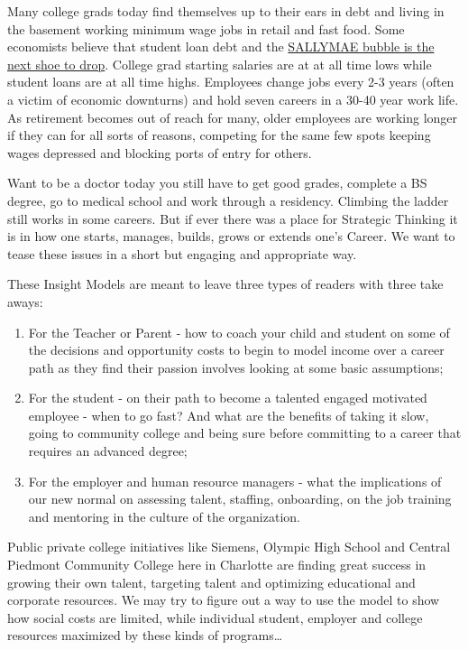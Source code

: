 \documentclass[]{memoir}
\begin{document}
Many college grads today find themselves up to their ears in debt and
living in the basement working minimum wage jobs in retail and fast
food. Some economists believe that student loan debt and the
\href{http://blogs.reuters.com/great-debate/2013/03/07/student-loan-bubble-babble/}{SALLYMAE
bubble is the next shoe to drop}. College grad starting salaries are at
at all time lows while student loans are at all time highs. Employees
change jobs every 2-3 years (often a victim of economic downturns) and
hold seven careers in a 30-40 year work life. As retirement becomes out
of reach for many, older employees are working longer if they can for
all sorts of reasons, competing for the same few spots keeping wages
depressed and blocking ports of entry for others.

Want to be a doctor today you still have to get good grades, complete a
BS degree, go to medical school and work through a residency. Climbing
the ladder still works in some careers. But if ever there was a place
for Strategic Thinking it is in how one starts, manages, builds, grows
or extends one's Career. We want to tease these issues in a short but
engaging and appropriate way.

These Insight Models are meant to leave three types of readers with
three take aways:

\begin{enumerate}
\def\labelenumi{\arabic{enumi}.}
\itemsep1pt\parskip0pt
\item
  For the Teacher or Parent - how to coach your child and student on
  some of the decisions and opportunity costs to begin to model income
  over a career path as they find their passion involves looking at some
  basic assumptions;
\item
  For the student - on their path to become a talented engaged motivated
  employee - when to go fast? And what are the benefits of taking it
  slow, going to community college and being sure before committing to a
  career that requires an advanced degree;
\item
  For the employer and human resource managers - what the implications
  of our new normal on assessing talent, staffing, onboarding, on the
  job training and mentoring in the culture of the organization.
\end{enumerate}

Public private college initiatives like Siemens, Olympic High School and
Central Piedmont Community College here in Charlotte are finding great
success in growing their own talent, targeting talent and optimizing
educational and corporate resources. We may try to figure out a way to
use the model to show how social costs are limited, while individual
student, employer and college resources maximized by these kinds of
programs\ldots{}
\end{document}
